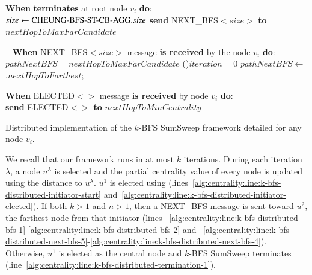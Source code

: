 {	\BlankLine	
	\BlankLine
	{\bf When} \cheungCbAgg{} {\bf terminates} at root node $v_i$ {\bf do}:\\
	$size \gets \text{CHEUNG-BFS-ST-CB-AGG{}}.size$\;
	 {
	} {
		{\bf send} NEXT\_BFS${<}size{>}$ {\bf to} $nextHopToMaxFarCandidate$\label{alg:centrality:line:k-bfs-distributed-next-bfs-3}\;
	}
	
	\BlankLine	
	\BlankLine
	
	\nonl~
	{\bf When} NEXT\_BFS${<}size{>}$ message {\bf is received} by the node $v_i$ {\bf do}:\label{alg:centrality:line:k-bfs-distributed-next-bfs-5}\\
	$pathNextBFS = nextHopToMaxFarCandidate$\;
	\If(\tcp*[h]{}){$iteration = 0$}{
		$pathNextBFS \gets $ \cheungIeCbAgg{}$.nextHopToFarthest$;		
	}	
	
	\BlankLine
	\BlankLine
	{\bf When} ELECTED${<}{>}$ message {\bf is received} by node $v_i$ {\bf do}:\label{alg:centrality:line:k-bfs-distributed-elected-msg-2}\\
	 {
		{\bf send} ELECTED${<}{>}$ {\bf to} $nextHopToMinCentrality$\;
		\label{alg:centrality:line:k-bfs-distributed-elected-msg-3}
	}
} {
	\caption{Distributed implementation of the $k$-BFS SumSweep framework detailed for any node $v_i$.\label{alg:centrality:k-bfs-distributed}}
}

We recall that our framework runs in at most $k$ iterations. During each iteration $\lambda$, a node $u^\lambda$ is selected and the partial centrality value of every node is updated using the distance to $u^\lambda$. $u^1$ is elected using \cheungIeCbAgg{} (lines~\ref{alg:centrality:line:k-bfs-distributed-initiator-start} and~\ref{alg:centrality:line:k-bfs-distributed-initiator-elected}). If both $k > 1$ and $n > 1$, then a NEXT\_BFS message is sent toward $u^2$, the farthest node from that initiator (lines ~\ref{alg:centrality:line:k-bfs-distributed-bfs-1}-\ref{alg:centrality:line:k-bfs-distributed-bfs-2} and ~\ref{alg:centrality:line:k-bfs-distributed-next-bfs-5}-\ref{alg:centrality:line:k-bfs-distributed-next-bfs-4}). Otherwise, $u^1$ is elected as the central node and $k$-BFS SumSweep terminates (line~\ref{alg:centrality:line:k-bfs-distributed-termination-1}). 

